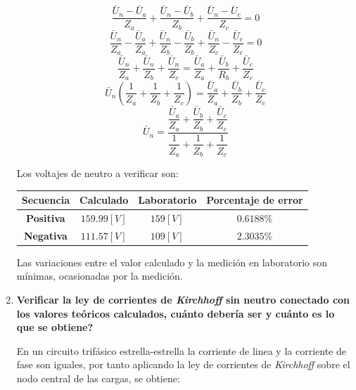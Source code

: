 \documentclass[letter,11pt]{article}
\begin{document}
\begin{enumerate}
\begin{equation*}
    \frac{\bar{U}_{n} - \bar{U}_a}{Z_a} + \frac{\bar{U}_{n} - \bar{U}_b}{Z_b} +
    \frac{\bar{U}_{n} - \bar{U}_c}{Z_c} = 0
\end{equation*}
\begin{equation*}
    \frac{\bar{U}_{n}}{Z_a} - \frac{\bar{U}_a}{Z_a} +
    \frac{\bar{U}_{n}}{Z_b} - \frac{\bar{U}_b}{Z_b} +
    \frac{\bar{U}_{n}}{Z_c} - \frac{\bar{U}_c}{Z_c} = 0
\end{equation*}
\begin{equation*}
    \frac{\bar{U}_{n}}{Z_a} + \frac{\bar{U}_{n}}{Z_b} +
    \frac{\bar{U}_{n}}{Z_c} =
    \frac{\bar{U}_a}{Z_a} + \frac{\bar{U}_b}{R_b} +
    \frac{\bar{U}_c}{Z_c}
\end{equation*}
\begin{equation*}
    \bar{U}_{n}\left(\frac{1}{Z_a} + \frac{1}{Z_b} +
    \frac{1}{Z_c} \right) =
    \frac{\bar{U}_a}{Z_a} + \frac{\bar{U}_b}{Z_b} +
    \frac{\bar{U}_c}{Z_c}
\end{equation*}
\begin{equation*}
    \bar{U}_{n}= \dfrac{\dfrac{\bar{U}_a}{Z_a} + \dfrac{\bar{U}_b}{Z_b} +
    \dfrac{\bar{U}_c}{Z_c}}{\dfrac{1}{Z_a} + \dfrac{1}{Z_b} + \dfrac{1}{Z_c}}
\end{equation*}

Los voltajes de neutro a verificar son:
\begin{center}
    \begin{tabular}{|c||c|c|c|}
    \hline
    \textbf{Secuencia} & \textbf{Calculado} & \textbf{Laboratorio} &
    \textbf{Porcentaje de error}
    \tabularnewline \hline \hline
    \textbf{Positiva} & $159.99[V]$ & $159[V]$ & $0.6188\%$
    \tabularnewline \hline
    \textbf{Negativa} & $111.57[V]$ & $109[V]$ & $2.3035\%$
    \tabularnewline \hline
    \end{tabular}
\end{center}

Las variaciones entre el valor calculado y la medición en laboratorio son
mínimas, ocasionadas por la medición.

\item \textbf{Verificar la ley de corrientes de \emph{Kirchhoff} sin neutro
conectado con los valores teóricos calculados, cuánto debería ser y cuánto es lo
que se obtiene?}

En un circuito trifásico estrella-estrella la corriente de linea y la corriente
de fase son iguales, por tanto aplicando la ley de corrientes de
\emph{Kirchhoff} sobre el nodo central de las cargas, se obtiene:


\end{enumerate}
\end{document}
